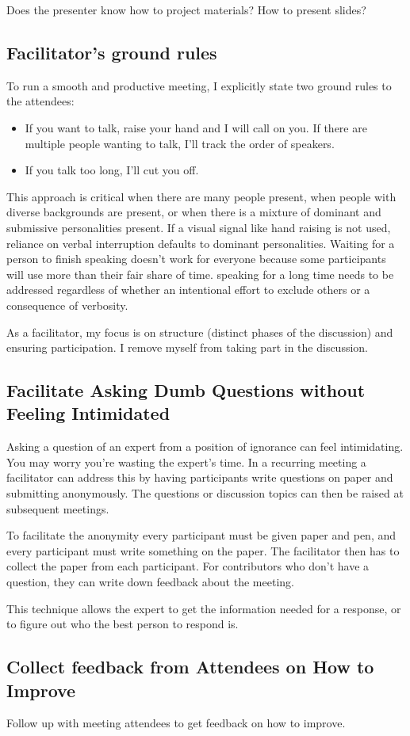 Does the presenter know how to project materials? How to present slides?

\subsection*{Facilitator's ground rules}

To run a smooth and productive meeting, I explicitly state two ground rules to the attendees:
\begin{itemize}
    \item If you want to talk, raise your hand and I will call on you. If there are multiple people wanting to talk, I'll track the order of speakers.
    \item If you talk too long, I'll cut you off. 
\end{itemize}
This approach is critical when there are many people present, when people with diverse backgrounds are present, or when there is a mixture of dominant and submissive personalities present. 
If a visual signal like hand raising is not used, reliance on verbal interruption defaults to dominant personalities. Waiting for a person to finish speaking doesn't work for everyone because some participants will use more than their fair share of time. speaking for a long time needs to be addressed regardless of whether an intentional effort to exclude others or a consequence of verbosity.

As a facilitator, my focus is on structure (distinct phases of the discussion) and ensuring participation. I remove myself from taking part in the discussion.

\subsection*{Facilitate Asking Dumb Questions without Feeling Intimidated}

Asking a question of an expert from a position of ignorance can feel intimidating. You may worry you're wasting the expert's time. In a recurring meeting a facilitator can address this by having participants write questions on paper and submitting anonymously. The questions or discussion topics can then be raised at subsequent meetings. 

To facilitate the anonymity every participant must be given paper and pen, and every participant must write something on the paper. The facilitator then has to collect the paper from each participant. For contributors who don't have a question, they can write down feedback about the meeting. 

This technique allows the expert to get the information needed for a response, or to figure out who the best person to respond is. 

\subsection*{Collect feedback from Attendees on How to Improve}

Follow up with meeting attendees to get feedback on how to improve.